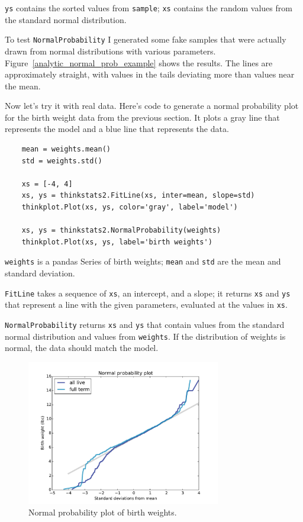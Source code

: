 \documentclass[12pt]{book}
\begin{document}
{\tt ys} contains the sorted values from {\tt sample}; {\tt xs}
contains the random values from the standard normal distribution.

To test {\tt NormalProbability} I generated some fake samples that
were actually drawn from normal distributions with various parameters.
Figure~\ref{analytic_normal_prob_example} shows the results.
The lines are approximately straight, with values in the tails
deviating more than values near the mean.

Now let's try it with real data.  Here's code to generate
a normal probability plot for the birth weight data from the
previous section.  It plots a gray line that represents the model
and a blue line that represents the data.

\begin{verbatim}
    mean = weights.mean()
    std = weights.std()

    xs = [-4, 4]
    xs, ys = thinkstats2.FitLine(xs, inter=mean, slope=std)
    thinkplot.Plot(xs, ys, color='gray', label='model')

    xs, ys = thinkstats2.NormalProbability(weights)
    thinkplot.Plot(xs, ys, label='birth weights')
\end{verbatim}

{\tt weights} is a pandas Series of birth weights;
{\tt mean} and {\tt std} are the mean and standard deviation.

{\tt FitLine} takes a sequence of {\tt xs}, an intercept, and a
slope; it returns {\tt xs} and {\tt ys} that represent a line
with the given parameters, evaluated at the values in {\tt xs}.

{\tt NormalProbability} returns {\tt xs} and {\tt ys} that
contain values from the standard normal distribution and values
from {\tt weights}.  If the distribution of weights is normal,
the data should match the model.

\begin{figure}
\centerline{\includegraphics[height=2.5in]{figs/analytic_birthwgt_normal.pdf}}
\caption{Normal probability plot of birth weights.}
\label{analytic_birthwgt_normal}
\end{figure}
\end{document}
